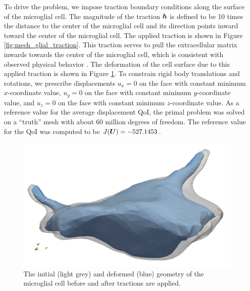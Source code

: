 To drive the problem, we impose traction boundary conditions along the
surface of the microglial cell. The magnitude of the traction $\boldsymbol{h}$ is
defined to be 10 times the distance to the center of the microglial cell and
its direction points inward toward the center of the microglial cell. The
applied traction is shown in Figure \ref{fig:mech_glial_traction}. This
traction serves to pull the extracellular matrix inwards towards the center
of the microglial cell, which is consistent with observed physical behavior
\cite{dong2017recovery}. The deformation of the cell surface due to this
applied traction is shown in Figure \ref{fig:mech_glial_deformed}. To
constrain rigid body translations and rotations, we prescribe displacements
$u_x = 0$ on the face with constant minimum $x$-coordinate value, $u_y = 0$
on the face with constant minimum $y$-coordinate value, and $u_z = 0$ on the
face with constant minimum $z$-coordinate value. As a reference value for
the average displacement QoI, the primal problem was solved on a ``truth''
mesh with about $60$ million degrees of freedom. The reference value for the
QoI was computed to be $J(\boldsymbol{U}) = -527.1453$.

\begin{figure}[ht!]
\centering
\includegraphics[width=.6\linewidth]{img/mech_glial_deformed.png}
\caption{The initial (light grey) and deformed (blue) geometry of the
microglial cell before and after tractions are applied.}
\label{fig:mech_glial_deformed}
\end{figure}


